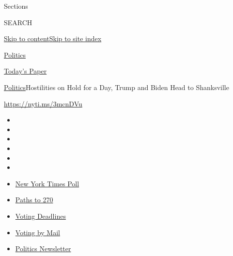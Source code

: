 Sections

SEARCH

\protect\hyperlink{site-content}{Skip to
content}\protect\hyperlink{site-index}{Skip to site index}

\href{https://www.nytimes3xbfgragh.onion/section/politics}{Politics}

\href{https://myaccount.nytimes3xbfgragh.onion/auth/login?response_type=cookie\&client_id=vi}{}

\href{https://www.nytimes3xbfgragh.onion/section/todayspaper}{Today's
Paper}

\href{/section/politics}{Politics}\textbar{}Hostilities on Hold for a
Day, Trump and Biden Head to Shanksville

\url{https://nyti.ms/3mcnDVu}

\begin{itemize}
\item
\item
\item
\item
\item
\item
\end{itemize}

\begin{itemize}
\item
  \href{https://www.nytimes3xbfgragh.onion/2020/09/12/us/politics/biden-trump-poll-wisconsin-minnesota.html?action=click\&pgtype=Article\&state=default\&region=TOP_BANNER\&context=storylines_menu}{New
  York Times Poll}
\item
  \href{https://www.nytimes3xbfgragh.onion/interactive/2020/us/elections/election-states-biden-trump.html?action=click\&pgtype=Article\&state=default\&region=TOP_BANNER\&context=storylines_menu}{Paths
  to 270}
\item
  \href{https://www.nytimes3xbfgragh.onion/interactive/2019/us/elections/2020-presidential-election-calendar.html?action=click\&pgtype=Article\&state=default\&region=TOP_BANNER\&context=storylines_menu}{Voting
  Deadlines}
\item
  \href{https://www.nytimes3xbfgragh.onion/interactive/2020/08/31/us/politics/vote-by-mail-deadlines.html?action=click\&pgtype=Article\&state=default\&region=TOP_BANNER\&context=storylines_menu}{Voting
  by Mail}
\item
  \href{https://www.nytimes3xbfgragh.onion/newsletters/politics?action=click\&pgtype=Article\&state=default\&region=TOP_BANNER\&context=storylines_menu}{Politics
  Newsletter}
\end{itemize}

